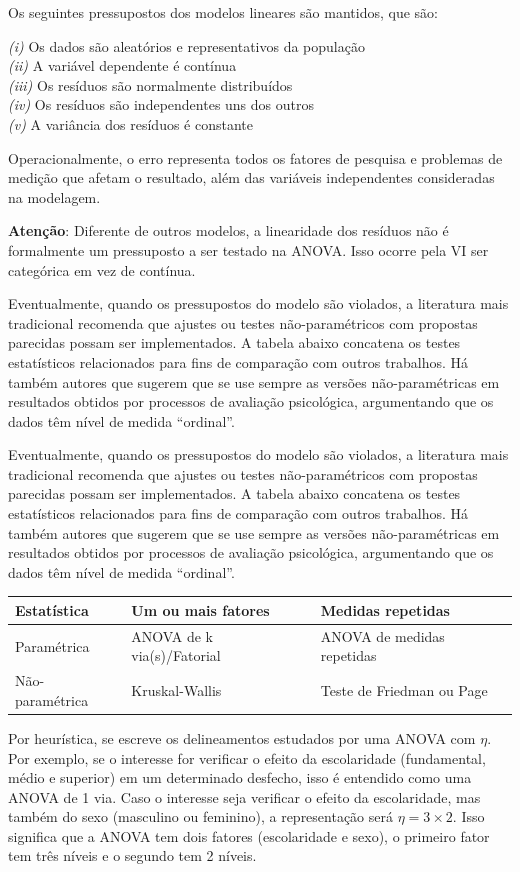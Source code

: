 \documentclass[
]{book}
\begin{document}
Os seguintes pressupostos dos modelos lineares são mantidos, que são:

\emph{(i)} Os dados são aleatórios e representativos da população\\
\emph{(ii)} A variável dependente é contínua\\
\emph{(iii)} Os resíduos são normalmente distribuídos\\
\emph{(iv)} Os resíduos são independentes uns dos outros\\
\emph{(v)} A variância dos resíduos é constante

Operacionalmente, o erro representa todos os fatores de pesquisa e problemas de medição que afetam o resultado, além das variáveis independentes consideradas na modelagem.

\textbf{Atenção}: Diferente de outros modelos, a linearidade dos resíduos não é formalmente um pressuposto a ser testado na ANOVA. Isso ocorre pela VI ser categórica em vez de contínua.

Eventualmente, quando os pressupostos do modelo são violados, a literatura mais tradicional recomenda que ajustes ou testes não-paramétricos com propostas parecidas possam ser implementados. A tabela abaixo concatena os testes estatísticos relacionados para fins de comparação com outros trabalhos. Há também autores que sugerem que se use sempre as versões não-paramétricas em resultados obtidos por processos de avaliação psicológica, argumentando que os dados têm nível de medida ``ordinal''.

Eventualmente, quando os pressupostos do modelo são violados, a literatura mais tradicional recomenda que ajustes ou testes não-paramétricos com propostas parecidas possam ser implementados. A tabela abaixo concatena os testes estatísticos relacionados para fins de comparação com outros trabalhos. Há também autores que sugerem que se use sempre as versões não-paramétricas em resultados obtidos por processos de avaliação psicológica, argumentando que os dados têm nível de medida ``ordinal''.

\begin{longtable}[]{@{}lll@{}}
\toprule
Estatística & Um ou mais fatores & Medidas repetidas\tabularnewline
\midrule
\endhead
Paramétrica & ANOVA de k via(s)/Fatorial & ANOVA de medidas repetidas\tabularnewline
Não-paramétrica & Kruskal-Wallis & Teste de Friedman ou Page\tabularnewline
\bottomrule
\end{longtable}

Por heurística, se escreve os delineamentos estudados por uma ANOVA com \(\eta\). Por exemplo, se o interesse for verificar o efeito da escolaridade (fundamental, médio e superior) em um determinado desfecho, isso é entendido como uma ANOVA de 1 via. Caso o interesse seja verificar o efeito da escolaridade, mas também do sexo (masculino ou feminino), a representação será \(\eta = 3 \times 2\). Isso significa que a ANOVA tem dois fatores (escolaridade e sexo), o primeiro fator tem três níveis e o segundo tem 2 níveis.
\end{document}
